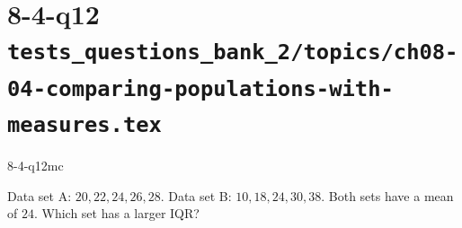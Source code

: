\documentclass[12pt, fleqn, openany]{studyGuide}
\begin{document}
\newpage
\section*{8-4-q12 \hfill \normalsize\texttt{tests\_questions\_bank\_2/topics/ch08-04-comparing-populations-with-measures.tex}}
\begin{practiceQuestion}{8-4-q12}{mc}
\begin{questionText}
Data set A: $20, 22, 24, 26, 28$. Data set B: $10, 18, 24, 30, 38$. Both sets have a mean of $24$. Which set has a larger IQR?
\end{questionText}
\end{practiceQuestion}

\newpage
\end{document}
